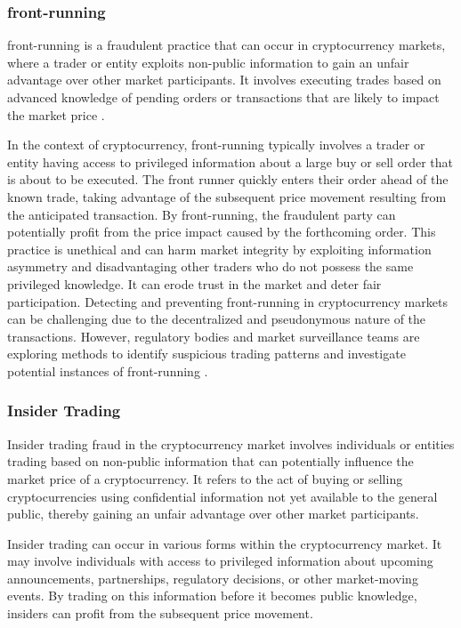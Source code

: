 \subsubsection{front-running}
front-running is a fraudulent practice that can occur in cryptocurrency markets, where a trader or entity exploits non-public
information to gain an unfair advantage over other market participants. It involves executing trades based on advanced
knowledge of pending orders or transactions that are likely to impact the market price \cite{van2021front}.

In the context of cryptocurrency, front-running typically involves a trader or entity having access to privileged information
about a large buy or sell order that is about to be executed. The front runner quickly enters their order ahead of the known
trade, taking advantage of the subsequent price movement resulting from the anticipated transaction. By front-running, the
fraudulent party can potentially profit from the price impact caused by the forthcoming order. This practice is unethical
and can harm market integrity by exploiting information asymmetry and disadvantaging other traders who do not possess the
same privileged knowledge. It can erode trust in the market and deter fair participation. Detecting and preventing
front-running in cryptocurrency markets can be challenging due to the decentralized and pseudonymous nature of the transactions.
However, regulatory bodies and market surveillance teams are exploring methods to identify suspicious trading patterns and
investigate potential instances of front-running \cite{bistarelli2018front}.

\subsubsection{Insider Trading}
Insider trading fraud in the cryptocurrency market involves individuals or entities trading based on non-public information
that can potentially influence the market price of a cryptocurrency. It refers to the act of buying or selling cryptocurrencies
using confidential information not yet available to the general public, thereby gaining an unfair advantage over other
market participants.

Insider trading can occur in various forms within the cryptocurrency market. It may involve individuals with access to
privileged information about upcoming announcements, partnerships, regulatory decisions, or other market-moving events.
By trading on this information before it becomes public knowledge, insiders can profit from the subsequent price movement.

